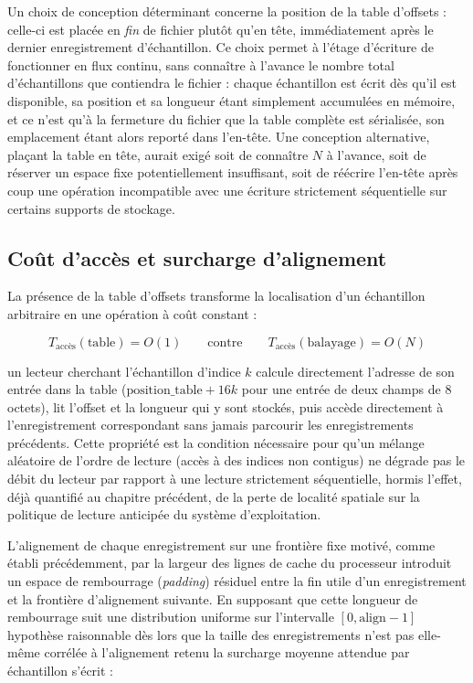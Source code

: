 \documentclass[12pt,a4paper]{report}
\begin{document}
Un choix de conception déterminant concerne la position de la table d'offsets : celle-ci est placée en \emph{fin} de fichier plutôt qu'en tête, immédiatement après le dernier enregistrement d'échantillon. Ce choix permet à l'étage d'écriture de fonctionner en flux continu, sans connaître à l'avance le nombre total d'échantillons que contiendra le fichier : chaque échantillon est écrit dès qu'il est disponible, sa position et sa longueur étant simplement accumulées en mémoire, et ce n'est qu'à la fermeture du fichier que la table complète est sérialisée, son emplacement étant alors reporté dans l'en-tête. Une conception alternative, plaçant la table en tête, aurait exigé soit de connaître $N$ à l'avance, soit de réserver un espace fixe potentiellement insuffisant, soit de réécrire l'en-tête après coup une opération incompatible avec une écriture strictement séquentielle sur certains supports de stockage.

\subsection{Coût d'accès et surcharge d'alignement}

La présence de la table d'offsets transforme la localisation d'un échantillon arbitraire en une opération à coût constant :

\begin{equation}
\label{eq:acces_o1}
T_{\text{accès}}(\text{table}) = O(1) \qquad \text{contre} \qquad T_{\text{accès}}(\text{balayage}) = O(N)
\end{equation}

un lecteur cherchant l'échantillon d'indice $k$ calcule directement l'adresse de son entrée dans la table ($\text{position\_table} + 16k$ pour une entrée de deux champs de 8 octets), lit l'offset et la longueur qui y sont stockés, puis accède directement à l'enregistrement correspondant sans jamais parcourir les enregistrements précédents. Cette propriété est la condition nécessaire pour qu'un mélange aléatoire de l'ordre de lecture (accès à des indices non contigus) ne dégrade pas le débit du lecteur par rapport à une lecture strictement séquentielle, hormis l'effet, déjà quantifié au chapitre précédent, de la perte de localité spatiale sur la politique de lecture anticipée du système d'exploitation.

L'alignement de chaque enregistrement sur une frontière fixe motivé, comme établi précédemment, par la largeur des lignes de cache du processeur introduit un espace de rembourrage (\textit{padding}) résiduel entre la fin utile d'un enregistrement et la frontière d'alignement suivante. En supposant que cette longueur de rembourrage suit une distribution uniforme sur l'intervalle $[0, \text{align}-1]$ hypothèse raisonnable dès lors que la taille des enregistrements n'est pas elle-même corrélée à l'alignement retenu la surcharge moyenne attendue par échantillon s'écrit :
\end{document}
